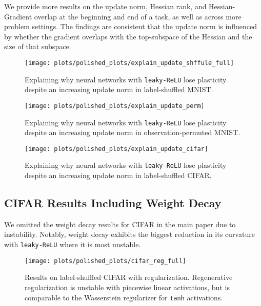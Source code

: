 We provide more results on the update norm, Hessian rank, and Hessian-Gradient overlap at the beginning and end of a task, as well as across more problem settings.
The findings are consistent that the update norm is influenced by whether the gradient overlaps with the top-subspace of the Hessian and the size of that subspace.

\begin{figure}[h!]
  \centering
  \texttt{[image: plots/polished\_plots/explain\_update\_shffule\_full]}
    \caption{Explaining why neural networks with \texttt{leaky-ReLU} lose plasticity despite an increasing update norm in label-shuffled MNIST.}
  \label{fig:explain_mnist_shuffle}
\end{figure}


\begin{figure}[H]
  \centering
  \texttt{[image: plots/polished\_plots/explain\_update\_perm]}
    \caption{Explaining why neural networks with \texttt{leaky-ReLU} lose plasticity despite an increasing update norm in observation-permuted MNIST.}
  \label{fig:explain_mnist_perm}
\end{figure}

\begin{figure}[H]
  \centering
  \texttt{[image: plots/polished\_plots/explain\_update\_cifar]}
    \caption{Explaining why neural networks with \texttt{leaky-ReLU} lose plasticity despite an increasing update norm in label-shuffled CIFAR.}
  \label{fig:explain_cifar}
\end{figure}


\clearpage

\subsection{CIFAR Results Including Weight Decay}
\label{appendix:cifar_weightdecay}

We omitted the weight decay results for CIFAR in the main paper due to instability. Notably, weight decay exhibits the biggest reduction in its curvature with \texttt{leaky-ReLU} where it is most unstable.

\begin{figure}[h!]
  \centering
  \texttt{[image: plots/polished\_plots/cifar\_reg\_full]}
  \caption{Results on label-shuffled CIFAR with regularization. Regenerative regularization is unstable with piecewise linear activations, but is comparable to the Wasserstein regularizer for \texttt{tanh} activations.
    }
  \end{figure}


